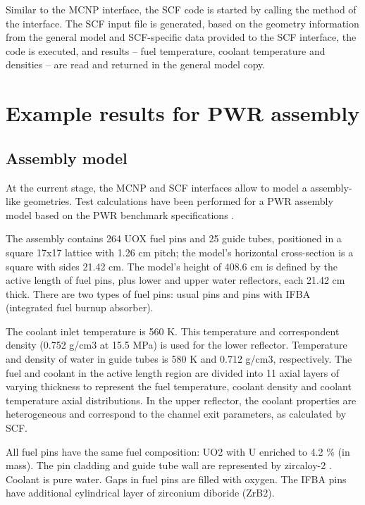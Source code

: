 \documentclass[a4paper,10pt,twocolumn,english]{sphinxsnamc2013}
\begin{document}
Similar to the MCNP interface, the SCF code is started by calling the 
method of the interface. The SCF input file is generated, based on the geometry
information from the general model and SCF-specific data provided to the SCF
interface, the code is executed, and results -- fuel temperature, coolant
temperature and densities -- are read and returned in the general model copy.


\section{Example results for PWR assembly}
\label{paper:example-results-for-pwr-assembly}

\subsection{Assembly model}
\label{paper:assembly-model}
At the current stage, the MCNP and SCF interfaces allow to model a
assembly-like geometries.  Test calculations have been performed for a PWR
assembly  model based on the PWR benchmark specifications
\cite{PWRbenchmark}.

The assembly contains 264 UOX fuel pins and 25 guide tubes, positioned in a
square 17x17 lattice with 1.26 cm pitch; the model's horizontal cross-section
is a square with sides 21.42 cm. The model's height of 408.6 cm is defined by
the active length of fuel pins, plus lower and upper water reflectors, each
21.42 cm thick.  There are  two types of fuel pins: usual pins and pins with
IFBA (integrated fuel burnup absorber).

The coolant inlet temperature is 560 K. This temperature and correspondent
density (0.752 g/cm3 at 15.5 MPa) is used for the lower reflector.
Temperature and density of water in guide tubes is 580 K and 0.712 g/cm3,
respectively. The fuel and coolant in the active length region are divided into
11 axial layers of varying thickness to represent the fuel temperature, coolant
density and coolant temperature axial distributions. In the upper reflector,
the coolant properties are heterogeneous and correspond to the channel exit
parameters, as calculated by SCF.

All fuel pins have the same fuel composition: UO2 with U enriched to 4.2 \% (in
mass). The pin cladding and guide tube wall are represented by zircaloy-2 \cite{PWRbenchmark}.
Coolant is pure water. Gaps in fuel pins are filled with oxygen. The IFBA pins
have additional cylindrical layer of zirconium diboride (ZrB2).
\end{document}
